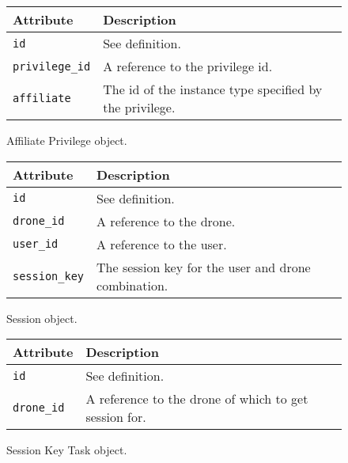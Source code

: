 \begin{figure}[htb]
\begin{center}
\begin{tabular}{ | l | p{8cm} | }
  \hline
    \textbf{Attribute} & \textbf{Description} \\ \hline
    \verb+id+ & See definition.\\ \hline
    \verb+privilege_id+ & A reference to the privilege id.\\ \hline
    \verb+affiliate+ & The id of the instance type specified by the privilege.\\ \hline
\end{tabular}
\caption{Affiliate Privilege object.}
\label{tab:affiliate_privilege_object}
\end{center}
\end{figure}

\begin{figure}[htb]
\begin{center}
\begin{tabular}{ | l | p{8cm} | }
  \hline
    \textbf{Attribute} & \textbf{Description} \\ \hline
    \verb+id+ & See definition.\\ \hline
    \verb+drone_id+ & A reference to the drone.\\ \hline
    \verb+user_id+ & A reference to the user.\\ \hline
    \verb+session_key+ & The session key for the user and drone combination.\\ \hline
\end{tabular}
\caption{Session object.}
\label{tab:session_object}
\end{center}
\end{figure}

\begin{figure}[htb]
\begin{center}
\begin{tabular}{ | l | p{8cm} | }
  \hline
    \textbf{Attribute} & \textbf{Description} \\ \hline
    \verb+id+ & See definition.\\ \hline
    \verb+drone_id+ & A reference to the drone of which to get session for.\\ \hline
\end{tabular}
\caption{Session Key Task object.}
\label{tab:session_key_task_object}
\end{center}
\end{figure}

